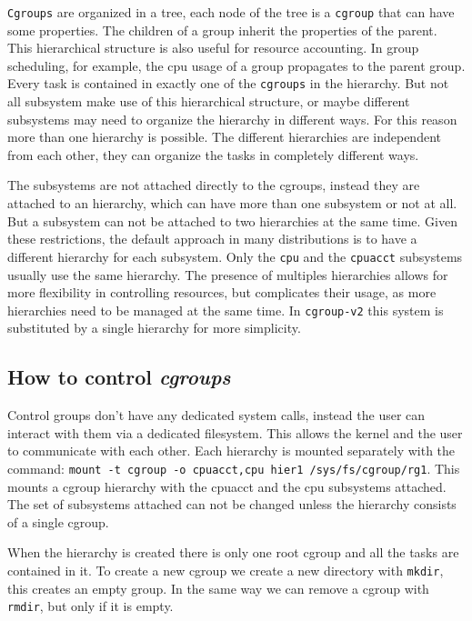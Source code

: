 \verb|Cgroups| are organized in a tree, each node of the tree is a \verb|cgroup| that can have some properties. The children of a group inherit the properties of the parent. This hierarchical structure is also useful for resource accounting. In group scheduling, for example, the cpu usage of a group propagates to the parent group. Every task is contained in exactly one of the \verb|cgroups| in the hierarchy. But not all subsystem make use of this hierarchical structure, or maybe different subsystems may need to organize the hierarchy in different ways. For this reason more than one hierarchy is possible. The different hierarchies are independent from each other, they can organize the tasks in completely different ways.

The subsystems are not attached directly to the cgroups, instead they are attached to an hierarchy, which can have more than one subsystem or not at all. But a subsystem can not be attached to two hierarchies at the same time. Given these restrictions, the default approach in many distributions is to have a different hierarchy for each subsystem. Only the \verb|cpu| and the \verb|cpuacct| subsystems usually use the same hierarchy. The presence of multiples hierarchies allows for more flexibility in controlling resources, but complicates their usage, as more hierarchies need to be managed at the same time. In \verb|cgroup-v2| this system is substituted by a single hierarchy for more simplicity.

\subsection{How to control \textit{cgroups}}
Control groups don't have any dedicated system calls, instead the user can interact with them via a dedicated filesystem. This allows the kernel and the user to communicate with each other. Each hierarchy is mounted separately with the command: \verb|mount -t cgroup -o cpuacct,cpu hier1 /sys/fs/cgroup/rg1|. \newline This mounts a cgroup hierarchy with the cpuacct and the cpu subsystems attached. The set of subsystems attached can not be changed unless the hierarchy consists of a single cgroup.

When the hierarchy is created there is only one root cgroup and all the tasks are contained in it. To create a new cgroup we create a new directory with \verb|mkdir|, this creates an empty group. In the same way we can remove a cgroup with \verb|rmdir|, but only if it is empty. 

